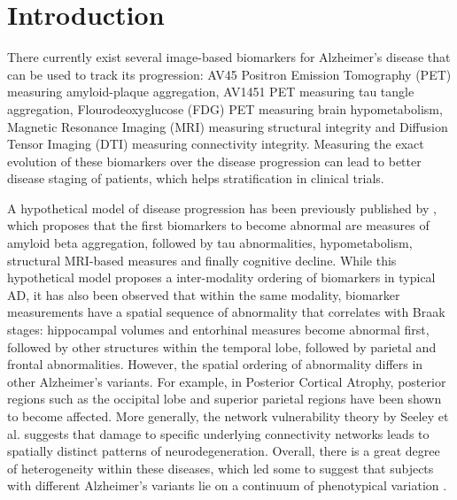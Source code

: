 \documentclass{llncs}
\begin{document}
\section{Introduction}


There currently exist several image-based biomarkers for Alzheimer's disease that can be used to track its progression: AV45 Positron Emission Tomography (PET) measuring amyloid-plaque aggregation, AV1451 PET measuring tau tangle aggregation, Flourodeoxyglucose (FDG) PET measuring brain hypometabolism, Magnetic Resonance Imaging (MRI) measuring structural integrity and Diffusion Tensor Imaging (DTI) measuring connectivity integrity. Measuring the exact evolution of these biomarkers over the disease progression can lead to better disease staging of patients, which helps stratification in clinical trials.


A hypothetical model of disease progression has been previously published by \cite{jack2010hypothetical}, which proposes that the first biomarkers to become abnormal are measures of amyloid beta aggregation, followed by tau abnormalities, hypometabolism, structural MRI-based measures and finally cognitive decline. While this hypothetical model proposes a inter-modality ordering of biomarkers in typical AD, it has also been observed that within the same modality, biomarker measurements have a spatial sequence of abnormality that correlates with Braak stages: hippocampal volumes and entorhinal measures become abnormal first, followed by other structures within the temporal lobe, followed by parietal and frontal abnormalities. However, the spatial ordering of abnormality differs in other Alzheimer's variants. For example, in Posterior Cortical Atrophy, posterior regions such as the occipital lobe and superior parietal regions have been shown to become affected. More generally, the network vulnerability theory by Seeley et al. \cite{seeley2009neurodegenerative} suggests that damage to specific underlying connectivity networks leads to spatially distinct patterns of neurodegeneration. Overall, there is a great degree of heterogeneity within these diseases, which led some to suggest that subjects with different Alzheimer's variants lie on a continuum of phenotypical variation \cite{crutch2012posterior}. 
% 
% 
\end{document}
